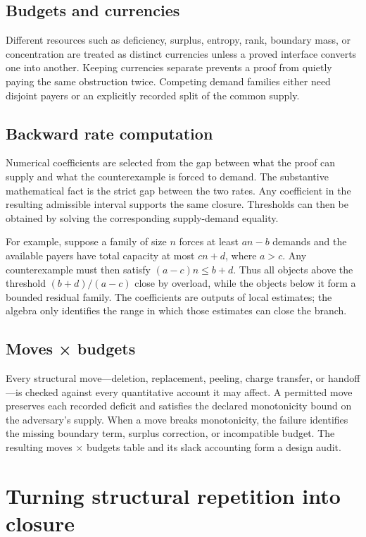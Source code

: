 \documentclass[11pt]{article}
\begin{document}
\subsection{Budgets and currencies}
Different resources such as deficiency, surplus, entropy, rank, boundary mass, or concentration are treated as distinct currencies unless a proved interface converts one into another.
Keeping currencies separate prevents a proof from quietly paying the same obstruction twice.
Competing demand families either need disjoint payers or an explicitly recorded split of the common supply.
\subsection{Backward rate computation}
Numerical coefficients are selected from the gap between what the proof can supply and what the counterexample is forced to demand.
The substantive mathematical fact is the strict gap between the two rates. Any coefficient in the resulting admissible interval supports the same closure.
Thresholds can then be obtained by solving the corresponding supply-demand equality.

For example, suppose a family of size \(n\) forces at least
\(a n-b\) demands and the available payers have total capacity at most
\(c n+d\), where \(a>c\). Any counterexample must then satisfy
\((a-c)n\leq b+d\). Thus all objects above the threshold
\((b+d)/(a-c)\) close by overload, while the objects below it form a bounded
residual family. The coefficients are outputs of local estimates; the algebra
only identifies the range in which those estimates can close the branch.
\subsection{Moves × budgets}
Every structural move—deletion, replacement, peeling, charge transfer, or handoff—is checked against every quantitative account it may affect.
A permitted move preserves each recorded deficit and satisfies the declared monotonicity bound on the adversary's supply.
When a move breaks monotonicity, the failure identifies the missing boundary term, surplus correction, or incompatible budget.
The resulting moves × budgets table and its slack accounting form a design audit.
\section{Turning structural repetition into closure}
\end{document}
